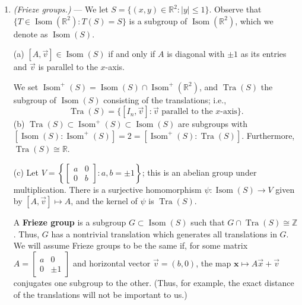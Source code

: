 \documentclass[leqno]{book}
\begin{document}
\begin{enumerate}
(h) Show that $S^3_R$ is the set of all right isoclinic rotations.  [Use part (f) and the second half of part (c) to show that $S^3_R$ contains all right isoclinic rotations.  Conversely, given an element of $S^3_R$, use part (g) to show that it is a right isoclinic rotation.]

(i) For $g\in O(4)-SO(4)$ [i.e., $g$ is an orientation-reversing isometry of $\mathbb R^4$], $S^3_L=\{gag^{-1}:a\in S^3_R\}$ is a normal subgroup of $SO(4)$, and is the set of all left isoclinic rotations (hence is independent of which $g$ is picked).

(j) $S^3_L\cap S^3_R=\{I_4,-I_4\}$.

(k) If $A\in S^3_L$ and $B\in S^3_R$, then $AB=BA$.  [Part (j) and the normality of the subgroups entail $A^{-1}B^{-1}AB=\pm I_4$.  Now, $A^{-1}B^{-1}AB=I_4$ if $A=B=I_4$, and the expression varies continuously in the entries of $A$ and $B$.]

\item\emph{(Frieze groups.)} \---- We let $S=\{(x,y)\in\mathbb R^2:|y|\leqslant 1\}$.  Observe that $\{T\in\operatorname{Isom}(\mathbb R^2):T(S)=S\}$ is a subgroup of $\operatorname{Isom}(\mathbb R^2)$, which we denote as $\operatorname{Isom}(S)$.

(a) $[A,\vec v]\in\operatorname{Isom}(S)$ if and only if $A$ is diagonal with $\pm 1$ as its entries and $\vec v$ is parallel to the $x$-axis.

We set $\operatorname{Isom}^+(S)=\operatorname{Isom}(S)\cap\operatorname{Isom}^+(\mathbb R^2)$, and $\operatorname{Tra}(S)$ the subgroup of $\operatorname{Isom}(S)$ consisting of the translations; i.e.,
$$\operatorname{Tra}(S)=\{[I_n,\vec v]:\vec v\text{ parallel to the }x\text{-axis}\}.$$
(b) $\operatorname{Tra}(S)\subset\operatorname{Isom}^+(S)\subset\operatorname{Isom}(S)$ are subgroups with $[\operatorname{Isom}(S):\operatorname{Isom}^+(S)]=2=[\operatorname{Isom}^+(S):\operatorname{Tra}(S)]$.  Furthermore, $\operatorname{Tra}(S)\cong\mathbb R$.

(c) Let $V=\left\{\begin{bmatrix}a&0\\0&b\end{bmatrix}:a,b=\pm 1\right\}$; this is an abelian group under multiplication.  There is a surjective homomorphism $\psi:\operatorname{Isom}(S)\to V$ given by $[A,\vec v]\mapsto A$, and the kernel of $\psi$ is $\operatorname{Tra}(S)$.

A \textbf{Frieze group} is a subgroup $G\subset\operatorname{Isom}(S)$ such that $G\cap\operatorname{Tra}(S)\cong\mathbb Z$.  Thus, $G$ has a nontrivial translation which generates all translations in $G$.  We will assume Frieze groups to be the same if, for some matrix $A=\begin{bmatrix}a&0\\0&\pm 1\end{bmatrix}$ and horizontal vector $\vec v=(b,0)$, the map $\mathbf x\mapsto A\vec x+\vec v$ conjugates one subgroup to the other.  (Thus, for example, the exact distance of the translations will not be important to us.)


\end{enumerate}
\end{document}
